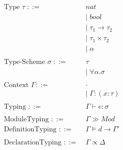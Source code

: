 \documentclass[10pt,a4paper,draft]{article}
\begin{document}
\begin{flushleft}
\begin{align*}
\text{Type }\tau \; ::= \; &nat \\
&| \; bool \\
&| \; \tau_{1} \rightarrow \tau_{2} \\
&| \; \tau_{1} \times \tau_{2} \\
&| \; \alpha \\
\\
\text{Type-Scheme } \sigma \; ::= \; &\tau \\
&| \; \forall \alpha . \sigma \\
\\
\text{Context }\Gamma ::=\; &\cdot \\
&| \; \Gamma :(x:\tau) \\
\\
\text{Typing } ::=\;&\Gamma \vdash e: \sigma \\
\\
\text{ModuleTyping } ::= \; &\Gamma \gg Mod
\\
\text{DefinitionTyping } ::= \; &\Gamma \models d \rightarrow \Gamma'\\
\\
\text{DeclarationTyping } ::= \;&\Gamma \propto \Delta
\end{align*}


\end{flushleft}
\end{document}
